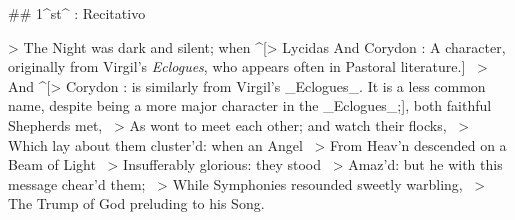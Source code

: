## 1^st^ \mvmt: Recitativo


> The Night was dark and silent; when ^[> Lycidas \newline And Corydon : A character, originally from Virgil's \textit{Eclogues}, who appears often in Pastoral literature.] \
> And ^[> Corydon : is similarly from Virgil's _Eclogues_. It is a less common name, despite being a more major character in the _Eclogues_;], both faithful Shepherds met,  \
> As wont to meet each other; and watch their flocks,  \
> Which lay about them cluster’d: when an Angel  \
> From Heav’n descended on a Beam of Light  \
> Insufferably glorious: they stood  \
> Amaz’d: but he with this message chear’d them;  \
> While Symphonies resounded sweetly warbling,  \
> The Trump of God preluding to his Song.

